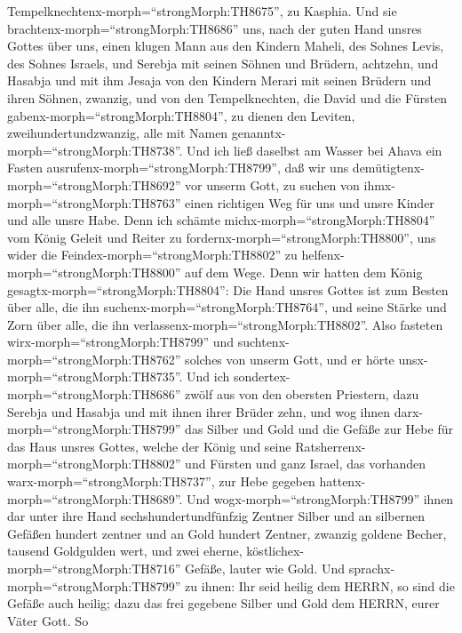 Tempelknechtenx-morph=``strongMorph:TH8675'', zu Kasphia. 
Und sie brachtenx-morph=``strongMorph:TH8686'' uns, nach der guten Hand
unsres Gottes über uns, einen klugen Mann aus den Kindern Maheli, des
Sohnes Levis, des Sohnes Israels, und Serebja mit seinen Söhnen und
Brüdern, achtzehn,  und Hasabja und mit ihm Jesaja von den
Kindern Merari mit seinen Brüdern und ihren Söhnen, zwanzig,
 und von den Tempelknechten, die David und die Fürsten
gabenx-morph=``strongMorph:TH8804'', zu dienen den Leviten,
zweihundertundzwanzig, alle mit Namen
genanntx-morph=``strongMorph:TH8738''.  Und ich ließ
daselbst am Wasser bei Ahava ein Fasten
ausrufenx-morph=``strongMorph:TH8799'', daß wir uns
demütigtenx-morph=``strongMorph:TH8692'' vor unserm Gott, zu suchen von
ihmx-morph=``strongMorph:TH8763'' einen richtigen Weg für uns und unsre
Kinder und alle unsre Habe.  Denn ich schämte
michx-morph=``strongMorph:TH8804'' vom König Geleit und Reiter zu
fordernx-morph=``strongMorph:TH8800'', uns wider die
Feindex-morph=``strongMorph:TH8802'' zu
helfenx-morph=``strongMorph:TH8800'' auf dem Wege. Denn wir hatten dem
König gesagtx-morph=``strongMorph:TH8804'': Die Hand unsres Gottes ist
zum Besten über alle, die ihn suchenx-morph=``strongMorph:TH8764'', und
seine Stärke und Zorn über alle, die ihn
verlassenx-morph=``strongMorph:TH8802''.  Also fasteten
wirx-morph=``strongMorph:TH8799'' und
suchtenx-morph=``strongMorph:TH8762'' solches von unserm Gott, und er
hörte unsx-morph=``strongMorph:TH8735''.  Und ich
sondertex-morph=``strongMorph:TH8686'' zwölf aus von den obersten
Priestern, dazu Serebja und Hasabja und mit ihnen ihrer Brüder zehn,
 und wog ihnen darx-morph=``strongMorph:TH8799'' das Silber
und Gold und die Gefäße zur Hebe für das Haus unsres Gottes, welche der
König und seine Ratsherrenx-morph=``strongMorph:TH8802'' und Fürsten und
ganz Israel, das vorhanden warx-morph=``strongMorph:TH8737'', zur Hebe
gegeben hattenx-morph=``strongMorph:TH8689''.  Und
wogx-morph=``strongMorph:TH8799'' ihnen dar unter ihre Hand
sechshundertundfünfzig Zentner Silber und an silbernen Gefäßen hundert
zentner und an Gold hundert Zentner,  zwanzig goldene
Becher, tausend Goldgulden wert, und zwei eherne,
köstlichex-morph=``strongMorph:TH8716'' Gefäße, lauter wie Gold.
 Und sprachx-morph=``strongMorph:TH8799'' zu ihnen: Ihr
seid heilig dem HERRN, so sind die Gefäße auch heilig; dazu das frei
gegebene Silber und Gold dem HERRN, eurer Väter Gott.  So
